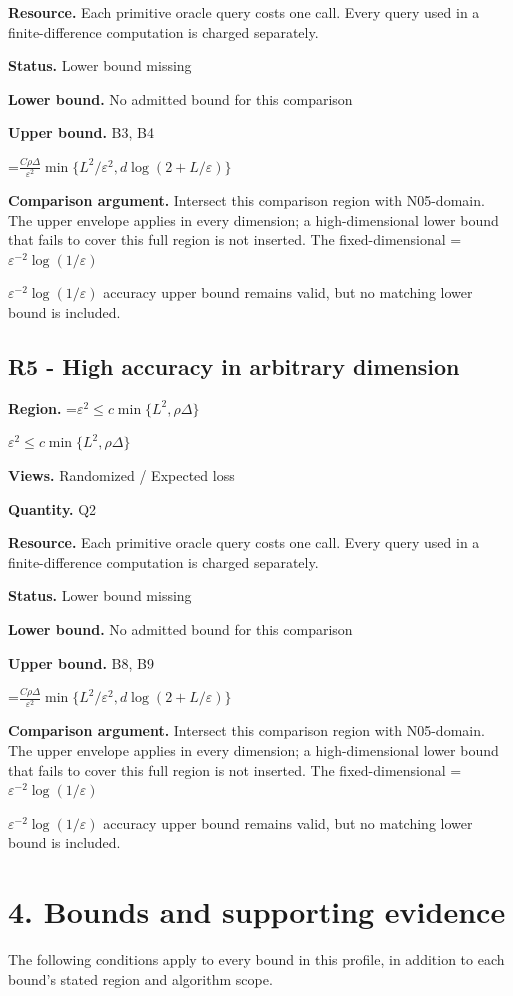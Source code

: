 \documentclass[10pt,a4paper]{article}
\newcommand{\AtlasMath}[1]{\par\begingroup\centering\setbox0=\hbox{$\displaystyle #1$}\ifdim\wd0>1.4\linewidth\typeout{ATLAS WIDE FORMULA: \the\wd0}\fi\ifdim\wd0>\linewidth\resizebox{\linewidth}{!}{\box0}\else\box0\fi\par\endgroup}
\newcommand{\AtlasInlineMath}[1]{\begingroup\setbox0=\hbox{$#1$}\ifdim\wd0>.4\linewidth\endgroup\AtlasMath{#1}\else\endgroup$#1$\fi}
\begin{document}
\textbf{Resource.} Each primitive oracle query costs one call. Every query used in a finite-difference computation is charged separately.

\textbf{Status.} Lower bound missing

\textbf{Lower bound.} No admitted bound for this comparison

\textbf{Upper bound.} B3, B4

\AtlasMath{\frac{C\rho\Delta}{\varepsilon^2}\min\{L^2/\varepsilon^2,d\log(2+L/\varepsilon)\}}
\textbf{Comparison argument.} Intersect this comparison region with N05-domain. The upper envelope applies in every dimension; a high-dimensional lower bound that fails to cover this full region is not inserted. The fixed-dimensional \AtlasInlineMath{\varepsilon^{-2}\log(1/\varepsilon)} accuracy upper bound remains valid, but no matching lower bound is included.

\subsection{R5 - High accuracy in arbitrary dimension}
\textbf{Region.} \AtlasInlineMath{\varepsilon^2\le c\min\{L^2,\rho\Delta\}}

\textbf{Views.} Randomized / Expected loss

\textbf{Quantity.} Q2

\textbf{Resource.} Each primitive oracle query costs one call. Every query used in a finite-difference computation is charged separately.

\textbf{Status.} Lower bound missing

\textbf{Lower bound.} No admitted bound for this comparison

\textbf{Upper bound.} B8, B9

\AtlasMath{\frac{C\rho\Delta}{\varepsilon^2}\min\{L^2/\varepsilon^2,d\log(2+L/\varepsilon)\}}
\textbf{Comparison argument.} Intersect this comparison region with N05-domain. The upper envelope applies in every dimension; a high-dimensional lower bound that fails to cover this full region is not inserted. The fixed-dimensional \AtlasInlineMath{\varepsilon^{-2}\log(1/\varepsilon)} accuracy upper bound remains valid, but no matching lower bound is included.

\section{4. Bounds and supporting evidence}
The following conditions apply to every bound in this profile, in addition to each bound's stated region and algorithm scope.
\end{document}
